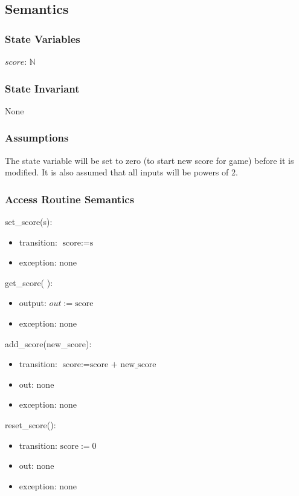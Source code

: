 \documentclass[12pt]{article}
\begin{document}
\subsection* {Semantics}

\subsubsection* {State Variables}

$\mathit{score}$: $\mathbb{N}$

\subsubsection* {State Invariant}

None

\subsubsection* {Assumptions}

The state variable will be set to zero (to start new score for game) before it is modified. It is also assumed that all inputs will be powers of $2$.

\subsubsection* {Access Routine Semantics}

\noindent set\_score(s):
\begin{itemize}
\item transition: $\text{score} := \text{s}$
\item exception: none
\end{itemize}

\noindent get\_score( ):
\begin{itemize}
\item output: $out := \text{score}$
\item exception: none
\end{itemize}

\noindent add\_score(new\_score):
\begin{itemize}
\item transition: $\text{score} := \text{score + new\_score}$
\item out: none
\item exception: none
\end{itemize}

\noindent reset\_score():
\begin{itemize}
\item transition: $\text{score} := 0$
\item out: none
\item exception: none
\end{itemize}
\end{document}
